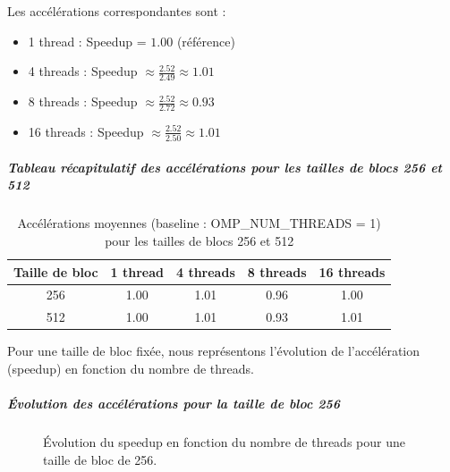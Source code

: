 \documentclass[a4paper,13pt]{book}
\begin{document}
Les accélérations correspondantes sont :
\begin{itemize}
    \item 1 thread : Speedup = \(1.00\) (référence)
    \item 4 threads : Speedup \(\approx \frac{2.52}{2.49} \approx 1.01\)
    \item 8 threads : Speedup \(\approx \frac{2.52}{2.72} \approx 0.93\)
    \item 16 threads : Speedup \(\approx \frac{2.52}{2.50} \approx 1.01\)
\end{itemize}
\subparagraph*{Tableau récapitulatif des accélérations pour les tailles de blocs 256 et 512}
\begin{table}[ht]
    \centering
    \caption{Accélérations moyennes (baseline : OMP\_NUM\_THREADS = 1) pour les tailles de blocs 256 et 512}
    \label{tab:speedup256512}
    \begin{tabular}{|c|c|c|c|c|}
        \hline
        Taille de bloc & 1 thread & 4 threads & 8 threads & 16 threads \\ \hline
        256          & 1.00     & 1.01      & 0.96      & 1.00       \\ \hline
        512          & 1.00     & 1.01      & 0.93      & 1.01       \\ \hline
    \end{tabular}
\end{table}
Pour une taille de bloc fixée, nous représentons l'évolution de l'accélération (speedup) en fonction du nombre de threads.
\subparagraph*{Évolution des accélérations pour la taille de bloc 256}

\begin{figure}[ht]
    \centering
    \caption{Évolution du speedup en fonction du nombre de threads pour une taille de bloc de 256.}
    \label{fig:speedup256}
\end{figure}
\end{document}
